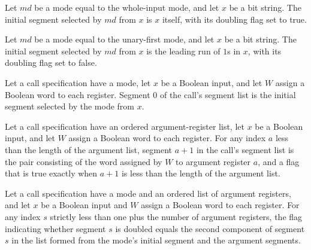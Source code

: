 \begin{lemma}
\label{Complexity.LogProg.Mode.seg0_whole}
\leanok
{}
Let $md$ be a mode equal to the whole-input mode, and let $x$ be a bit string. The
initial segment selected by $md$ from $x$ is $x$ itself, with its doubling flag set to
true.
\end{lemma}

\begin{lemma}
\label{Complexity.LogProg.Mode.seg0_unaryFst}
\leanok
{}
Let $md$ be a mode equal to the unary-first mode, and let $x$ be a bit string. The
initial segment selected by $md$ from $x$ is the leading run of $1$s in $x$, with its
doubling flag set to false.
\end{lemma}

\begin{lemma}
\label{Complexity.LogProg.seg_callSegs_zero}
\leanok
{}
Let a call specification have a mode, let $x$ be a Boolean input, and let $W$ assign a
Boolean word to each register. Segment $0$ of the call's segment list is the initial
segment selected by the mode from $x$.
\end{lemma}

\begin{lemma}
\label{Complexity.LogProg.seg_callSegs_succ}
\leanok
{}
Let a call specification have an ordered argument-register list, let $x$ be a Boolean
input, and let $W$ assign a Boolean word to each register. For any index $a$ less than
the length of the argument list, segment $a+1$ in the call's segment list is the pair
consisting of the word assigned by $W$ to argument register $a$, and a flag that is true
exactly when $a+1$ is less than the length of the argument list.
\end{lemma}

\begin{lemma}
\label{Complexity.LogProg.segDbl_eq}
\leanok
{}
Let a call specification have a mode and an ordered list of argument registers, and let
$x$ be a Boolean input and $W$ assign a Boolean word to each register. For any index $s$
strictly less than one plus the number of argument registers, the flag indicating
whether segment $s$ is doubled equals the second component of segment $s$ in the list
formed from the mode's initial segment and the argument segments.
\end{lemma}

